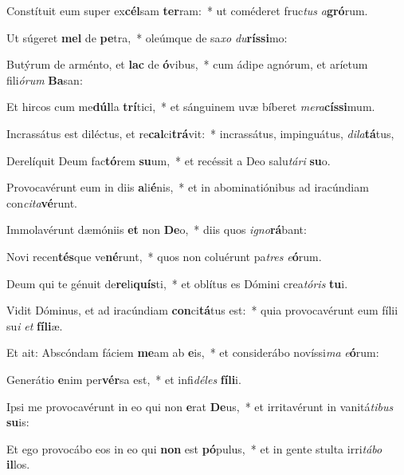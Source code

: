 \item Constítuit eum super ex\textbf{cél}sam \textbf{ter}ram:~* ut coméderet fruc\textit{tus} \textit{a}\textbf{gró}rum.
\item Ut súgeret \textbf{mel} de \textbf{pe}tra,~* oleúmque de sa\textit{xo} \textit{du}\textbf{rís}\textbf{si}mo:
\item Butýrum de arménto, et \textbf{lac} de \textbf{ó}vibus,~* cum ádipe agnórum, et aríetum fili\textit{ó}\textit{rum} \textbf{Ba}san:
\item Et hircos cum me\textbf{dúl}la \textbf{trí}tici,~* et sánguinem uvæ bíberet \textit{me}\textit{ra}\textbf{cís}\textbf{si}mum.
\item Incrassátus est diléctus, et re\textbf{cal}ci\textbf{trá}vit:~* incrassátus, impinguátus, \textit{di}\textit{la}\textbf{tá}tus,
\item Derelíquit Deum fac\textbf{tó}rem \textbf{su}um,~* et recéssit a Deo salu\textit{tá}\textit{ri} \textbf{su}o.
\item Provocavérunt eum in diis \textbf{a}li\textbf{é}nis,~* et in abominatiónibus ad iracúndiam con\textit{ci}\textit{ta}\textbf{vé}runt.
\item Immolavérunt dæmóniis \textbf{et} non \textbf{De}o,~* diis quos \textit{i}\textit{gno}\textbf{rá}bant:
\item Novi recen\textbf{tés}que ve\textbf{né}runt,~* quos non coluérunt pa\textit{tres} \textit{e}\textbf{ó}rum.
\item Deum qui te génuit de\textbf{re}li\textbf{quís}ti,~* et oblítus es Dómini crea\textit{tó}\textit{ris} \textbf{tu}i.
\item Vidit Dóminus, et ad iracúndiam \textbf{con}ci\textbf{tá}tus est:~* quia provocavérunt eum fílii su\textit{i} \textit{et} \textbf{fí}\textbf{li}æ.
\item Et ait: Abscóndam fáciem \textbf{me}am ab \textbf{e}is,~* et considerábo novíssi\textit{ma} \textit{e}\textbf{ó}rum:
\item Generátio \textbf{e}nim per\textbf{vér}sa est,~* et infi\textit{dé}\textit{les} \textbf{fí}\textbf{li}i.
\item Ipsi me provocavérunt in eo qui non \textbf{e}rat \textbf{De}us,~* et irritavérunt in vanitá\textit{ti}\textit{bus} \textbf{su}is:
\item Et ego provocábo eos in eo qui \textbf{non} est \textbf{pó}pulus,~* et in gente stulta irri\textit{tá}\textit{bo} \textbf{il}los.
